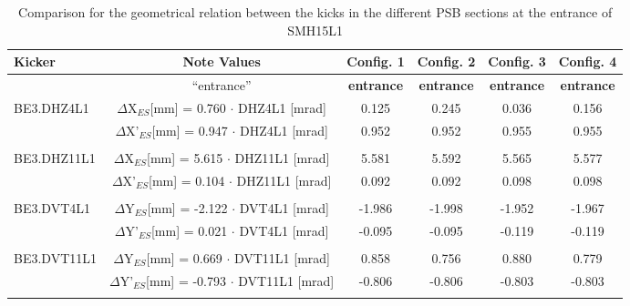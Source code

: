 \documentclass[11pt,letter,english]{article}
\begin{document}
\begin{table}[h]

  \caption{
    Comparison for the geometrical relation between the kicks in the different PSB sections at the entrance of SMH15L1
    }

  \label{tab:geom_rel}
\hspace*{-1.3cm}\begin{tabular}{ |l|c|c|c|c|c| }        \hline
  Kicker & Note Values  & Config. 1 &  Config. 2 & Config. 3 & Config. 4 \\ \hline
         & ``entrance'' & {\bf entrance}  & {\bf entrance}  & {\bf entrance}  & {\bf entrance}  \\ \hline
  \multirow{2}{*}{BE3.DHZ4L1} & $\Delta$X$_{ES}$[mm]  = 0.760 $\cdot$ DHZ4L1 [mrad] & 0.125 & 0.245 & 0.036 & 0.156\\  \cline{2-6}
                              & $\Delta$X'$_{ES}$[mm] = 0.947 $\cdot$ DHZ4L1 [mrad]  & 0.952 & 0.952 & 0.955 & 0.955\\ \hline      
  \multicolumn{6}{|c|}{}        \\ \hline

  \multirow{2}{*}{BE3.DHZ11L1} & $\Delta$X$_{ES}$[mm]  = 5.615 $\cdot$ DHZ11L1 [mrad] & 5.581 & 5.592 & 5.565 & 5.577\\ \cline{2-6} 
                               & $\Delta$X'$_{ES}$[mm] = 0.104 $\cdot$ DHZ11L1 [mrad] & 0.092 & 0.092 & 0.098 & 0.098\\ \hline      
 \multicolumn{6}{|c|}{} \\ \hline

 \multirow{2}{*}{BE3.DVT4L1} & $\Delta$Y$_{ES}$[mm]  = -2.122 $\cdot$ DVT4L1 [mrad] & -1.986 & -1.998 & -1.952 & -1.967\\  \cline{2-6}  
                             & $\Delta$Y'$_{ES}$[mm] =  0.021 $\cdot$ DVT4L1 [mrad] & -0.095 & -0.095 & -0.119 & -0.119\\  \hline       
 \multicolumn{6}{|c|}{} \\ \hline

 \multirow{2}{*}{BE3.DVT11L1} & $\Delta$Y$_{ES}$[mm]  =  0.669 $\cdot$ DVT11L1 [mrad] & 0.858 & 0.756 & 0.880 & 0.779\\     \cline{2-6}  
                              & $\Delta$Y'$_{ES}$[mm] = -0.793 $\cdot$ DVT11L1 [mrad] & -0.806 & -0.806 & -0.803 & -0.803\\ \hline       
 \multicolumn{6}{|c|}{} \\ \hline

\end{tabular}
\end{table}
\end{document}
